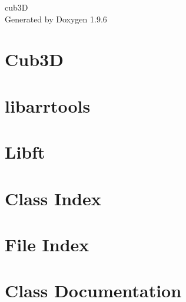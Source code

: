\documentclass[twoside]{book}
\newcommand{\+}{\discretionary{\mbox{\scriptsize$\hookleftarrow$}}{}{}}
\newcommand{\clearemptydoublepage}{%
    \newpage{\pagestyle{empty}\cleardoublepage}%
  }
\begin{document}
  \raggedbottom
    \hypersetup{pageanchor=false,
                bookmarksnumbered=true,
                pdfencoding=unicode
               }
  \begin{titlepage}
  \vspace*{7cm}
  \begin{center}%
  {\Large cub3D}\\
  \vspace*{1cm}
  {\large Generated by Doxygen 1.9.6}\\
  \end{center}
  \end{titlepage}
  \clearemptydoublepage
  \tableofcontents
  \clearemptydoublepage
  \hypersetup{pageanchor=true}
\chapter{Cub3D}
\label{index}\hypertarget{index}{}
\chapter{libarrtools}
\label{md___users_ssergiu_projects_cub3_d_libs_libarrtools__r_e_a_d_m_e}

\chapter{Libft}
\label{md___users_ssergiu_projects_cub3_d_libs__libft__r_e_a_d_m_e}

\chapter{Class Index}

\chapter{File Index}

\chapter{Class Documentation}






\end{document}
